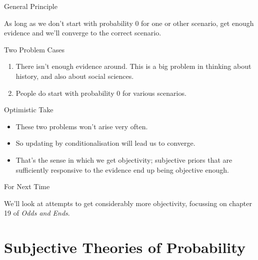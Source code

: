 \documentclass[
  ignorenonframetext,
]{beamer}
\providecommand{\tightlist}{%
  \setlength{\itemsep}{0pt}\setlength{\parskip}{0pt}}
\renewcommand{\,}{\text{, }}
\begin{document}
\begin{frame}{General Principle}
\protect\hypertarget{general-principle-1}{}

As long as we don't start with probability 0 for one or other scenario,
get enough evidence and we'll converge to the correct scenario.

\end{frame}

\begin{frame}{Two Problem Cases}
\protect\hypertarget{two-problem-cases}{}

\begin{enumerate}
\tightlist
\item
  There isn't enough evidence around. This is a big problem in thinking
  about history, and also about social sciences.
\item
  People do start with probability 0 for various scenarios.
\end{enumerate}

\end{frame}

\begin{frame}{Optimistic Take}
\protect\hypertarget{optimistic-take}{}

\begin{itemize}
\tightlist
\item
  These two problems won't arise very often.
\item
  So updating by conditionalisation will lead us to converge.
\item
  That's the sense in which we get objectivity; subjective priors that
  are sufficiently responsive to the evidence end up being objective
  enough.
\end{itemize}

\end{frame}

\begin{frame}{For Next Time}
\protect\hypertarget{for-next-time-11}{}

We'll look at attempts to get considerably more objectivity, focussing
on chapter 19 of \emph{Odds and Ends}.

\end{frame}

\hypertarget{subjective-theories-of-probability}{%
\section{Subjective Theories of
Probability}\label{subjective-theories-of-probability}}
\end{document}
